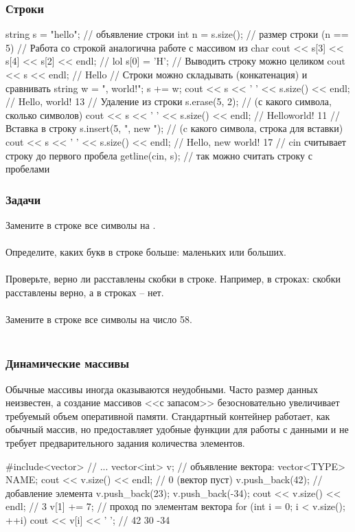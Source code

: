 \documentclass[PDF,10pt,usenames,dvipsnames,t,fragile]{beamer}
\newcommand{\bigqm}[1][1]{\text{\rm\larger[#1]{\textbf{?}}}}
\newcommand{\prblm}[1]{{\bigqm[1]} {#1 \\} \vspace{-6pt} \\} %
\begin{document}
\begin{frame}[fragile]
	\frametitle{Строки}
	\begin{code}
string s = "hello"; // объявление строки
int n = s.size(); // размер строки (n == 5)
// Работа со строкой аналогична работе с массивом из char
cout << s[3] << s[4] << s[2] << endl; // lol
s[0] = 'H';
// Выводить строку можно целиком
cout << s << endl; // Hello
// Строки можно складывать (конкатенация) и сравнивать
string w = ", world!"; s += w;
cout << s << ' ' << s.size() << endl; // Hello, world! 13
// Удаление из строки
s.erase(5, 2); // (с какого символа, сколько символов)
cout << s << ' ' << s.size() << endl; // Helloworld! 11
// Вставка в строку
s.insert(5, ", new "); // (c какого символа, строка для вставки)
cout << s << ' ' << s.size() << endl; // Hello, new world! 17
// cin считывает строку до первого пробела
getline(cin, s); // так можно считать строку с пробелами
	\end{code}
\end{frame}

\begin{frame}
	\frametitle{Задачи}
	\prblm{Замените в строке все символы  на .}
	\prblm{Определите, каких букв в строке больше: маленьких или больших.}
	\prblm{Проверьте, верно ли расставлены скобки в строке. Например, в строках: \lcode{"g(5)-2", "2 + (a-(b+5))", "((2-3) + (c-d))"} скобки расставлены верно, а в строках \lcode{"(u-3(", "15+a)", "2 - ) 3 + (7) ("} -- нет.}
	\prblm{Замените в строке все символы  на число 58.}
\end{frame}

\begin{frame}[fragile]
	\frametitle{Динамические массивы}
Обычные массивы иногда оказываются неудобными. Часто размер данных неизвестен, а
	создание массивов <<с запасом>> безосновательно увеличивает требуемый объем
	оперативной памяти. Стандартный контейнер  работает, как обычный
	массив, но предоставляет удобные функции для работы с данными и не требует
	предварительного задания количества элементов.
	\begin{code}
#include<vector>
// ...
vector<int> v; // объявление вектора: vector<TYPE> NAME;
cout << v.size() << endl; // 0 (вектор пуст)
v.push_back(42); // добавление элемента
v.push_back(23);
v.push_back(-34);
cout << v.size() << endl; // 3
v[1] += 7;
// проход по элементам вектора
for (int i = 0; i < v.size(); ++i)
	cout << v[i] << ' '; // 42 30 -34
	\end{code}
\end{frame}
\end{document}

